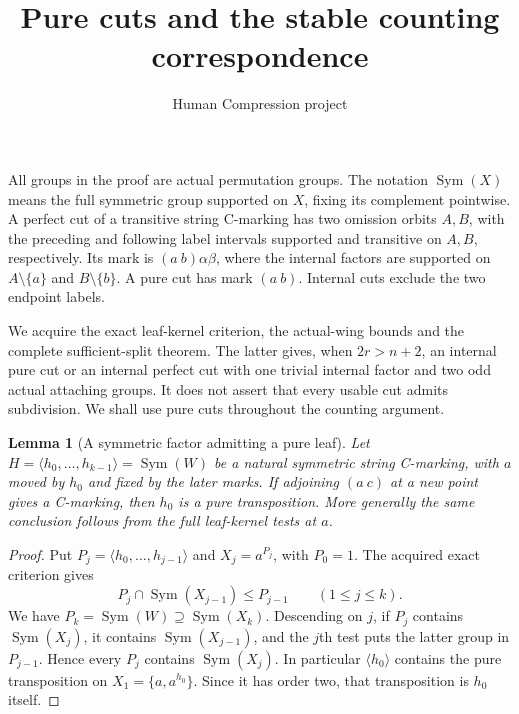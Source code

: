 \documentclass[11pt,a4paper]{article}
\title{Pure cuts and the stable counting correspondence}
\author{Human Compression project}\date{}
\newtheorem{lemma}{Lemma}\newtheorem{theorem}[lemma]{Theorem}
\newcommand{\gen}[1]{\langle#1\rangle}
\newcommand{\Sym}{\operatorname{Sym}}
\begin{document}
\maketitle
All groups in the proof are actual permutation groups. The notation
$\Sym(X)$ means the full symmetric group supported on $X$, fixing its
complement pointwise. A perfect cut of a transitive string C-marking
has two omission orbits $A,B$, with the preceding and following label
intervals supported and transitive on $A,B$, respectively. Its mark is
$(a\ b)\alpha\beta$, where the internal factors are supported on
$A\setminus\{a\}$ and $B\setminus\{b\}$. A pure cut has mark $(a\ b)$.
Internal cuts exclude the two endpoint labels.

We acquire the exact leaf-kernel criterion, the actual-wing bounds and
the complete sufficient-split theorem. The latter gives, when $2r>n+2$,
an internal pure cut or an internal perfect cut with one trivial internal
factor and two odd actual attaching groups. It does not assert that every
usable cut admits subdivision. We shall use pure cuts throughout the
counting argument.

\begin{lemma}[A symmetric factor admitting a pure leaf]\label{backwards}
Let $H=\gen{h_0,\ldots,h_{k-1}}=\Sym(W)$ be a natural symmetric
string C-marking, with $a$ moved by $h_0$ and fixed by the later marks.
If adjoining $(a\ c)$ at a new point gives a C-marking, then $h_0$
is a pure transposition. More generally the same conclusion follows
from the full leaf-kernel tests at $a$.
\end{lemma}
\begin{proof}
Put $P_j=\gen{h_0,\ldots,h_{j-1}}$ and $X_j=a^{P_j}$, with
$P_0=1$. The acquired exact criterion gives
\[
 P_j\cap\Sym(X_{j-1})\le P_{j-1}\qquad(1\le j\le k).
\]
We have $P_k=\Sym(W)\supseteq\Sym(X_k)$. Descending on $j$, if
$P_j$ contains $\Sym(X_j)$, it contains $\Sym(X_{j-1})$, and the
$j$th test puts the latter group in $P_{j-1}$. Hence every $P_j$
contains $\Sym(X_j)$. In particular $\gen{h_0}$ contains the pure
transposition on $X_1=\{a,a^{h_0}\}$. Since it has order two, that
transposition is $h_0$ itself.
\end{proof}
\end{document}

